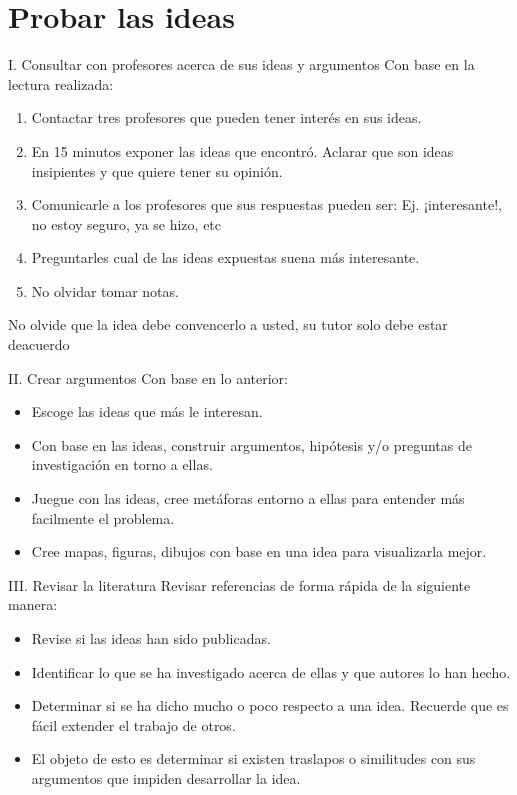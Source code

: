 \documentclass [xcolor=svgnames, t] {beamer}
\begin{document}
\section{Probar las ideas}
\begin{frame}{I. Consultar con profesores acerca de sus ideas y argumentos}
Con base en la lectura realizada:
\begin{enumerate}
\item Contactar tres profesores que pueden tener inter\'es en sus ideas.
\item En 15 minutos exponer las ideas que encontr\'o. Aclarar que son ideas insipientes y que quiere tener su opini\'on.
\item Comunicarle a los profesores que sus respuestas pueden ser: Ej. ¡interesante!, no estoy seguro, ya se hizo, etc
\item Preguntarles cual de las ideas expuestas suena m\'as interesante.
\item No olvidar tomar notas. 
\end{enumerate}
\centering
\alert{No olvide que la idea debe convencerlo a usted, su tutor solo debe estar deacuerdo}
\end{frame}

\begin{frame}{II. Crear argumentos}
Con base en lo anterior:
\begin{itemize}
\item Escoge las ideas que m\'as le interesan.
\item Con base en las ideas, construir argumentos, hip\'otesis y/o preguntas de investigaci\'on en torno a ellas. 
\item Juegue con las ideas, cree met\'aforas entorno a ellas para entender m\'as facilmente el problema.
\item Cree mapas, figuras, dibujos con base en una idea para visualizarla mejor.
\end{itemize}
\end{frame}

\begin{frame}{III. Revisar la literatura}
Revisar referencias de forma r\'apida de la siguiente manera:
\begin{itemize}
\item Revise si las ideas han sido publicadas.
\item Identificar lo que se ha investigado acerca de ellas y que autores lo han hecho.
\item Determinar si se ha dicho mucho o poco respecto a una idea. Recuerde que es f\'acil extender el trabajo de otros.
\item El objeto de esto es determinar si existen traslapos o similitudes con sus argumentos que impiden desarrollar la idea.
\end{itemize}
\end{frame}
\end{document}

